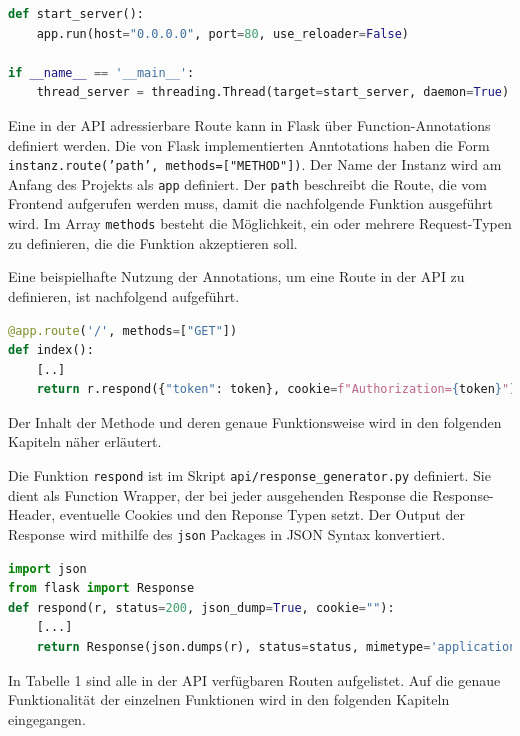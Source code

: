 \begin{lstlisting}[language=Python, caption={Flask im eigenen Thread starten}]
def start_server():
    app.run(host="0.0.0.0", port=80, use_reloader=False)

if __name__ == '__main__':
    thread_server = threading.Thread(target=start_server, daemon=True).start()
\end{lstlisting}

Eine in der API adressierbare Route kann in Flask über Function-Annotations definiert werden. Die von Flask implementierten Anntotations haben die Form \texttt{instanz.route('path', methods=["METHOD"])}. Der Name der Instanz wird am Anfang des Projekts als \texttt{app} definiert. Der \texttt{path} beschreibt die Route, die vom Frontend aufgerufen werden muss, damit die nachfolgende Funktion ausgeführt wird. Im Array \texttt{methods} besteht die Möglichkeit, ein oder mehrere Request-Typen zu definieren, die die Funktion akzeptieren soll.

Eine beispielhafte Nutzung der Annotations, um eine Route in der API zu definieren, ist nachfolgend aufgeführt. 

\begin{lstlisting}[language=Python, caption={Beispiel einer API-Routendefinition über Annotations}]
@app.route('/', methods=["GET"])
def index():
    [..]
    return r.respond({"token": token}, cookie=f"Authorization={token}")
\end{lstlisting}

Der Inhalt der Methode und deren genaue Funktionsweise wird in den folgenden Kapiteln näher erläutert.

Die Funktion \texttt{respond} ist im Skript \texttt{api/response\_{}generator.py} definiert. Sie dient als Function Wrapper, der bei jeder ausgehenden Response die Response-Header, eventuelle Cookies und den Reponse Typen setzt. Der Output der Response wird mithilfe des \texttt{json} Packages in JSON Syntax konvertiert.

\begin{lstlisting}[language=Python, caption={Respond Funktion zur Rückgabe von JSON-Responses}]
import json
from flask import Response
def respond(r, status=200, json_dump=True, cookie=""):
    [...]
    return Response(json.dumps(r), status=status, mimetype='application/json', headers=headers)
\end{lstlisting}

In Tabelle 1 sind alle in der API verfügbaren Routen aufgelistet. Auf die genaue Funktionalität der einzelnen Funktionen wird in den folgenden Kapiteln eingegangen.

